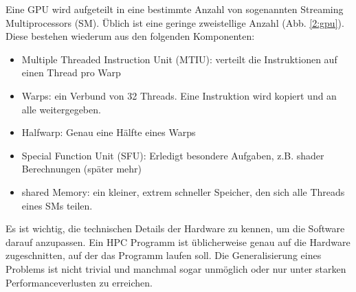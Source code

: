 		Eine GPU wird aufgeteilt in eine bestimmte Anzahl von sogenannten Streaming Multiprocessors (\Gls{SM}). Üblich ist eine geringe zweistellige Anzahl (Abb. \ref{2:gpu}). Diese bestehen wiederum aus den folgenden Komponenten:
		
		\begin{itemize}
	        	\item Multiple Threaded Instruction Unit (\Gls{MTIU}): verteilt die Instruktionen auf einen \Gls{Thread} pro \Gls{Warp}
        		\item \Glspl{Warp}: ein Verbund von 32 \Glspl{Thread}. Eine Instruktion wird kopiert und an alle weitergegeben.
		    \item \Gls{Halfwarp}: Genau eine Hälfte eines \glspl{Warp}
		    \item Special Function Unit (SFU): Erledigt besondere Aufgaben, z.B. shader Berechnungen (später mehr) 
        		\item \Gls{shared Memory}: ein kleiner, extrem schneller Speicher, den sich alle \Glspl{Thread} eines \Gls{SM}s teilen.
		\end{itemize}

		Es ist wichtig, die technischen Details der Hardware zu kennen, um die Software darauf anzupassen. Ein HPC Programm ist üblicherweise genau auf die Hardware zugeschnitten, auf der das Programm laufen soll. Die Generalisierung eines Problems ist nicht trivial und manchmal sogar unmöglich oder nur unter starken \Gls{Performance}verlusten zu erreichen.	